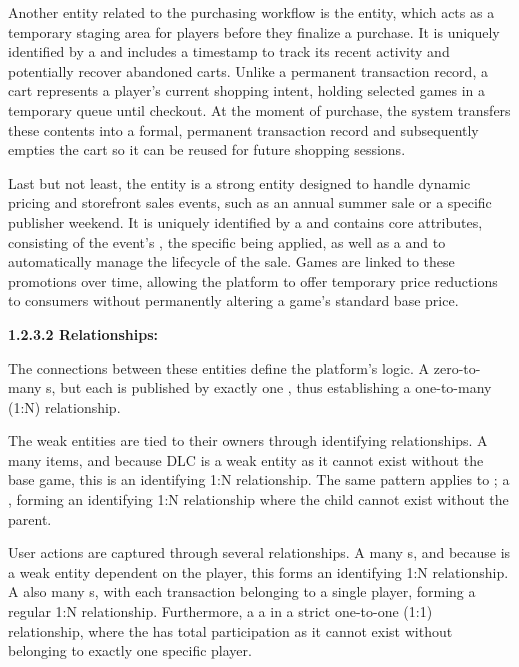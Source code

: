 Another entity related to the purchasing workflow is the  entity, which acts as a temporary staging area for players before they finalize a purchase. It is uniquely identified by a  and includes a  timestamp to track its recent activity and potentially recover abandoned carts. Unlike a permanent transaction record, a cart represents a player's current shopping intent, holding selected games in a temporary queue until checkout. At the moment of purchase, the system transfers these contents into a formal, permanent transaction record and subsequently empties the cart so it can be reused for future shopping sessions.

Last but not least, the  entity is a strong entity designed to handle dynamic pricing and storefront sales events, such as an annual summer sale or a specific publisher weekend. It is uniquely identified by a  and contains core attributes, consisting of the event's , the specific  being applied, as well as a  and  to automatically manage the lifecycle of the sale. Games are linked to these promotions over time, allowing the platform to offer temporary price reductions to consumers without permanently altering a game's standard base price.

\noindent\textbf{1.2.3.2 Relationships:}

The connections between these entities define the platform's logic. A   zero-to-many s, but each  is published by exactly one , thus establishing a one-to-many (1:N) relationship.

The weak entities are tied to their owners through identifying relationships. A   many  items, and because DLC is a weak entity as it cannot exist without the base game, this is an identifying 1:N relationship. The same pattern applies to ; a   , forming an identifying 1:N relationship where the child cannot exist without the parent.

User actions are captured through several relationships. A   many s, and because  is a weak entity dependent on the player, this forms an identifying 1:N relationship. A  also  many s, with each transaction belonging to a single player, forming a regular 1:N relationship. Furthermore, a   a  in a strict one-to-one (1:1) relationship, where the  has total participation as it cannot exist without belonging to exactly one specific player.

